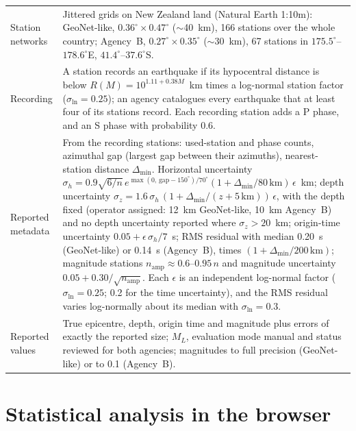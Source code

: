 \documentclass[11pt]{article}
\begin{document}
{\begin{longtable}{@{}p{2.9cm}p{13.2cm}@{}}
Station networks & Jittered grids on New Zealand land (Natural Earth 1:10m):
  GeoNet-like, $0.36^{\circ} \times 0.47^{\circ}$ ($\sim$40~km), 166 stations over
  the whole country; Agency~B, $0.27^{\circ} \times 0.35^{\circ}$ ($\sim$30~km),
  67 stations in $175.5^{\circ}$--$178.6^{\circ}$E, $41.4^{\circ}$--$37.6^{\circ}$S. \\
Recording & A station records an earthquake if its hypocentral distance is below
  $R(M) = 10^{1.11 + 0.38M}$~km times a log-normal station factor
  ($\sigma_{\ln} = 0.25$); an agency catalogues every earthquake that at least
  four of its stations record.  Each recording station adds a P phase, and an S
  phase with probability 0.6. \\
Reported metadata & From the recording stations: used-station and phase counts,
  azimuthal gap (largest gap between their azimuths), nearest-station distance
  $\Delta_{\min}$.  Horizontal uncertainty
  $\sigma_h = 0.9\sqrt{6/n}\,e^{\max(0,\,\mathrm{gap}-150^{\circ})/70^{\circ}}
  (1 + \Delta_{\min}/80\,\mathrm{km})\,\epsilon$~km; depth uncertainty
  $\sigma_z = 1.6\,\sigma_h\,(1 + \Delta_{\min}/(z + 5\,\mathrm{km}))\,\epsilon$,
  with the depth fixed (operator assigned: 12~km GeoNet-like, 10~km Agency~B) and
  no depth uncertainty reported where $\sigma_z > 20$~km; origin-time uncertainty
  $0.05 + \epsilon\,\sigma_h/7$~s; RMS residual with median 0.20~s (GeoNet-like)
  or 0.14~s (Agency~B), times $(1 + \Delta_{\min}/200\,\mathrm{km})$; magnitude
  stations $n_{\mathrm{amp}} \approx 0.6$--$0.95\,n$ and magnitude uncertainty
  $0.05 + 0.30/\sqrt{n_{\mathrm{amp}}}$.  Each $\epsilon$ is an independent
  log-normal factor ($\sigma_{\ln} = 0.25$; 0.2 for the time uncertainty), and
  the RMS residual varies log-normally about its median with
  $\sigma_{\ln} = 0.3$. \\
Reported values & True epicentre, depth, origin time and magnitude plus errors of
  exactly the reported size; $M_L$, evaluation mode manual and status reviewed for
  both agencies; magnitudes to full precision (GeoNet-like) or to 0.1
  (Agency~B). \\
\end{longtable}
}

\section*{Statistical analysis in the browser}
\end{document}
